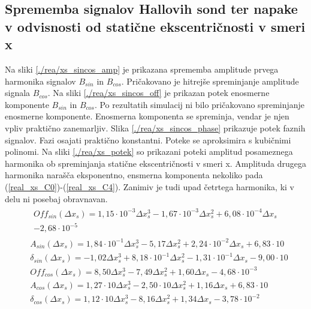 \subsection{Sprememba signalov Hallovih sond ter napake v odvisnosti od statične ekscentričnosti v smeri x}
Na sliki \ref{./rea/xs_sincos_amp} je prikazana sprememba amplitude prvega harmonika signalov $B_{sin}$ in $B_{cos}$. Pričakovano je hitrejše spreminjanje amplitude signala $B_{cos}$. Na sliki \ref{./rea/xs_sincos_off} je prikazan potek enosmerne komponente $B_{sin}$ in $B_{cos}$. Po rezultatih simulacij ni bilo pričakovano spreminjanje enosmerne komponente. Enosmerna komponenta se spreminja, vendar je njen vpliv praktično zanemarljiv. Slika \ref{./rea/xs_sincos_phase} prikazuje potek faznih signalov. Fazi osajati praktično konstantni.
\newpage
Poteke se aproksimira s kubičnimi polinomi.
Na sliki \ref{./rea/xs_potek} so prikazani poteki amplitud posameznega harmonika ob spreminjanja statične ekscentričnosti v smeri x. Amplituda drugega harmonika narašča eksponentno, ensmerna komponenta nekoliko pada (\ref{real_xs_C0})-(\ref{real_xs_C4}). Zanimiv je tudi upad četrtega harmonika, ki v delu ni posebaj obravnavan.
\begin{eqnarray}
&\begin{split}
Off_{sin}(\Delta x_s) =1,15\cdot 10^{-3}\Delta x_s^{3}-1,67\cdot 10^{-3}\Delta x_s^{2}+6,08\cdot 10^{-4}\Delta x_s\\-2,68\cdot 10^{-5}
\end{split}\\
&A_{sin}(\Delta x_s) =1,84\cdot 10^{-1}\Delta x_s^{3}-5,17\Delta x_s^{2}+2,24\cdot 10^{-2}\Delta x_s+6,83\cdot 10 \\                    
&\delta_{sin}(\Delta x_s) =-1,02\Delta x_s^{3}+8,18\cdot 10^{-1}\Delta x_s^{2}-1,31\cdot 10^{-1}\Delta x_s-9,00\cdot 10 \\              
&Off_{cos}(\Delta x_s) =8,50\Delta x_s^{3}-7,49\Delta x_s^{2}+1,60\Delta x_s-4,68\cdot 10^{-3} \\                                       
&A_{cos}(\Delta x_s) =1,27\cdot 10\Delta x_s^{3}-2,50\cdot 10\Delta x_s^{2}+1,16\Delta x_s+6,83\cdot 10 \\                              
&\delta_{cos}(\Delta x_s) =1,12\cdot 10\Delta x_s^{3}-8,16\Delta x_s^{2}+1,34\Delta x_s-3,78\cdot 10^{-2}
\end{eqnarray}
